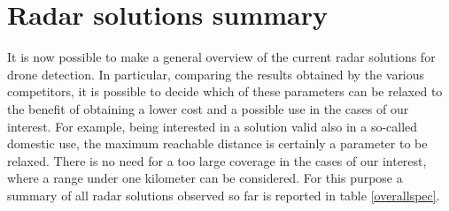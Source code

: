 \newpage
\section{Radar solutions summary}
It is now possible to make a general overview of the current radar solutions for drone detection. In particular, comparing the results obtained by the various competitors, it is possible to decide which of these parameters can be relaxed to the benefit of obtaining a lower cost and a possible use in the cases of our interest. For example, being interested in a solution valid also in a so-called domestic use, the maximum reachable distance is certainly a parameter to be relaxed. There is no need for a too large coverage in the cases of our interest, where a range under one kilometer can be considered. For this purpose a summary of all radar solutions observed so far is reported in table \ref{overallspec}.

